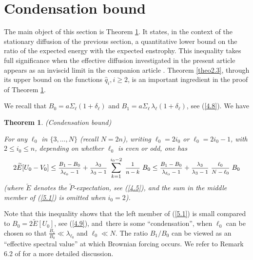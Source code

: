 \documentclass[12pt,leqno]{article}
\def\n{\noindent}
\def\dis{\displaystyle}
\def\f{\footnotesize}
\def\wh{\widehat}
\def\wt{\widetilde}
\newtheorem{theorem}{Theorem}[section]
\begin{document}
\section{Condensation bound}
\setcounter{equation}{0}

The main object of this section is Theorem \ref{theo5.1}. It states, in the context of the stationary diffusion of the previous section, a quantitative lower bound on the ratio of the expected energy with the expected enstrophy. This inequality takes full significance when the effective diffusion investigated in the present article appears as an inviscid limit in the companion article \cite{SzniWidm26b}. Theorem \ref{theo2.3}, through its upper bound on the functions $\wh{q}_i, i \ge 2$, is an important ingredient in the proof of Theorem \ref{theo5.1}.

\medskip
We recall that $B_0 = a \Sigma_\ell (1 + \delta_\ell)$ and $B_1 = a \Sigma_\ell \, \lambda_\ell (1 + \delta_\ell)$, see (\ref{4.8}). We have
\begin{theorem}\label{theo5.1} (Condensation bound)

\medskip\n
For any $\ell_0$ in $\{3, \dots, N\}$ (recall $N = 2n$), writing $\ell_0 = 2i_0$ or $\ell_0 = 2 i_0 -1$, with $2 \le i_0 \le n$, depending on whether $\ell_0$ is even or odd, one has
\begin{equation}\label{5.1}
2 \wt{E} [U_0 - V_0] \le \mbox{\f $\dis\frac{B_1 - B_0}{\lambda_{\ell_0} - 1}$} + \mbox{\f $\dis\frac{\lambda_3}{\lambda_3- 1}$}  \; \sum^{i_0 - 2}_{k=1} \; \mbox{\f $\dis\frac{1}{n-k}$}  \; B_0 \le  \mbox{\f $\dis\frac{B_1 - B_0}{\lambda_{\ell_0} - 1}$} +  \mbox{\f $\dis\frac{\lambda_3}{\lambda_3-1}$}  \; \mbox{\f $\dis\frac{\ell_0}{N - \ell_0}$} \;B_0 
\end{equation}
(where $\wt{E}$ denotes the $\wt{P}$-expectation, see {\rm (\ref{4.5})}, and the sum in the middle member of {\rm (\ref{5.1})} is omitted when $i_0 = 2$).
\end{theorem}

Note that this inequality shows that the left member of {\rm (\ref{5.1})} is small compared to $B_0 = 2 \wt{E}[U_0]$, see {\rm (\ref{4.9})}, and~there is some ``condensation'', when $\ell_0$ can be chosen so that $\frac{B_1}{B_0} \ll \lambda_{\ell_0}$ and $\ell_0 \ll N$. The ratio $B_1/B_0$ can be viewed as an ``effective spectral value'' at which Brownian forcing occurs. We refer to Remark 6.2 of \cite{SzniWidm26b} for a more detailed discussion.
\end{document}
